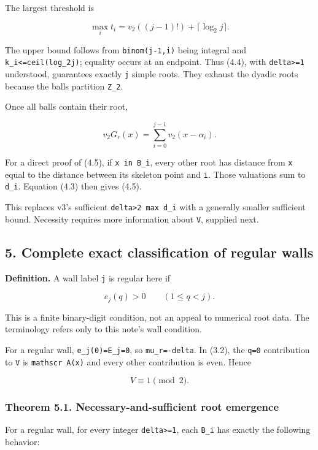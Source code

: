\documentclass[11pt,letterpaper]{article}
\begin{document}
The largest threshold is

\[
\boxed{\max_i t_i=v_2((j-1)!)+\lceil\log_2j\rceil.} \tag{4.4}
\]

The upper bound follows from \texttt{binom(j-1,i)} being integral and \texttt{k\_i\textless{}=ceil(log\_2j)}; equality occurs at an endpoint. Thus (4.4), with \texttt{delta\textgreater{}=1} understood, guarantees exactly \texttt{j} simple roots. They exhaust the dyadic roots because the balls partition \texttt{Z\_2}.

Once all balls contain their root,

\[
\boxed{v_2G_r(x)=\sum_{i=0}^{j-1}v_2(x-\alpha_i).} \tag{4.5}
\]

For a direct proof of (4.5), if \texttt{x\ in\ B\_i}, every other root has distance from \texttt{x} equal to the distance between its skeleton point and \texttt{i}. Those valuations sum to \texttt{d\_i}. Equation (4.3) then gives (4.5).

This replaces v3's sufficient \texttt{delta\textgreater{}2\ max\ d\_i} with a generally smaller sufficient bound. Necessity requires more information about \texttt{V}, supplied next.

\subsection{5. Complete exact classification of regular walls}\label{complete-exact-classification-of-regular-walls}

\textbf{Definition.} A wall label \texttt{j} is regular here if

\[
\boxed{e_j(q)>0\qquad(1\le q<j).} \tag{5.1}
\]

This is a finite binary-digit condition, not an appeal to numerical root data. The terminology refers only to this note's wall condition.

For a regular wall, \texttt{e\_j(0)=E\_j=0}, so \texttt{mu\_r=-delta}. In (3.2), the \texttt{q=0} contribution to \texttt{V} is \texttt{mathscr\ A(x)} and every other contribution is even. Hence

\[
V\equiv1\pmod2. \tag{5.2}
\]

\subsubsection{Theorem 5.1. Necessary-and-sufficient root emergence}\label{theorem-5.1.-necessary-and-sufficient-root-emergence}

For a regular wall, for every integer \texttt{delta\textgreater{}=1}, each \texttt{B\_i} has exactly the following behavior:
\end{document}

